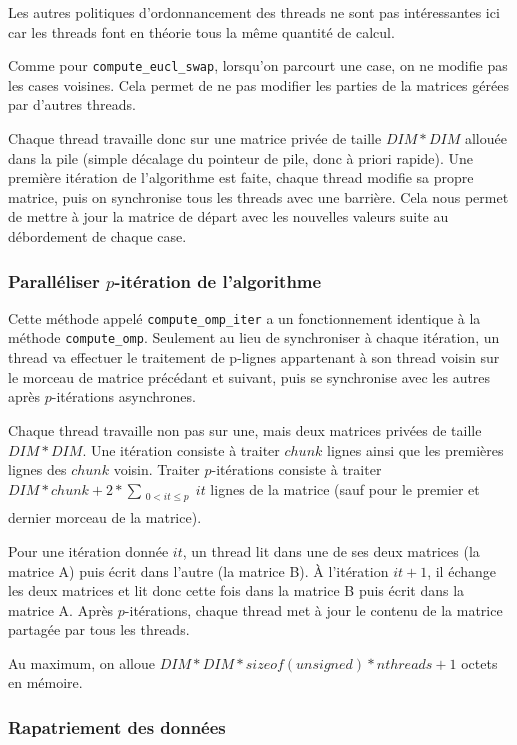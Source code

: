 Les autres politiques d'ordonnancement des threads ne sont pas
intéressantes ici car les threads font en théorie tous la même
quantité de calcul.

Comme pour \texttt{compute\_eucl\_swap}, lorsqu'on parcourt une case,
on ne modifie pas les cases voisines. Cela permet de ne pas modifier
les parties de la matrices gérées par d'autres threads.
\medskip

Chaque thread travaille donc sur une matrice privée de taille
$DIM*DIM$ allouée dans la pile (simple décalage du pointeur de pile,
donc à priori rapide). Une première itération de l'algorithme est
faite, chaque thread modifie sa propre matrice, puis on synchronise
tous les threads avec une barrière. Cela nous permet de mettre à jour
la matrice de départ avec les nouvelles valeurs suite au débordement
de chaque case.
\medskip

\subsubsection{Paralléliser $p$-itération de l'algorithme}

Cette méthode appelé \texttt{compute\_omp\_iter} a un fonctionnement
identique à la méthode \texttt{compute\_omp}. Seulement au lieu de
synchroniser à chaque itération, un thread va effectuer le traitement
de p-lignes appartenant à son thread voisin sur le morceau de matrice
précédant et suivant, puis se synchronise avec les autres après
$p$-itérations asynchrones.
\medskip

Chaque thread travaille non pas sur une, mais deux matrices privées de
taille $DIM*DIM$. Une itération consiste à traiter $chunk$ lignes
ainsi que les premières lignes des $chunk$ voisin. Traiter
$p$-itérations consiste à traiter
$DIM*chunk+2*\sum_{\substack{0<it\leq p \\}}it$ lignes de la matrice
(sauf pour le premier et dernier morceau de la matrice).

Pour une itération donnée $it$, un thread lit dans
une de ses deux matrices (la matrice A) puis écrit dans l'autre (la
matrice B). À l'itération $it+1$, il échange les deux matrices et lit
donc cette fois dans la matrice B puis écrit dans la matrice A. Après
$p$-itérations, chaque thread met à jour le contenu de la matrice
partagée par tous les threads.

Au maximum, on alloue $DIM*DIM*sizeof(unsigned)*nthreads+1$ octets en
mémoire.


\subsubsection{Rapatriement des données}

